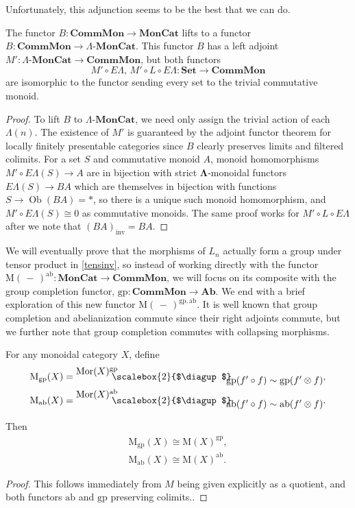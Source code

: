 \documentclass{amsbook} %
\newcommand{\mb}{\mathbf}
\newcommand{\Set}{\mb{Set}}
\newcommand{\ML}{\mathbf{\Lambda}}
\newcommand{\bigquotient}[2]{ \raisebox{0.75\height}{$#1$} \mkern-12mu\scalebox{2}{$\diagup$}\mkern-10mu \raisebox{-0.5\height}{$#2$} }
\newcommand{\EL}{E\Lambda}
\newcommand{\ob}{\operatorname{Ob}}
\newcommand{\lmc}{\Lambda\mbox{-}\mb{MonCat}}
\newcommand{\sets}{\Set}
\newcommand{\cmon}{\ensuremath{\mb{CommMon}}}
\newcommand{\moncat}{\ensuremath{\mb{MonCat}}}
\newcommand{\ab}{\mathrm{ab}}
\newcommand{\gp}{\mathrm{gp}}
\numberwithin{section}{chapter}
\begin{document}
Unfortunately, this adjunction seems to be the best that we can do. 
\begin{prop}
The functor $B \colon \cmon \rightarrow \moncat$ lifts to a functor $B \colon \cmon \rightarrow \lmc$. This functor $B$ has a left adjoint $M' \colon \lmc \rightarrow \cmon$, but both functors
  \[
    M' \circ \EL, \, M' \circ L \circ \EL \colon \sets \rightarrow \cmon
  \]
are isomorphic to the functor sending every set to the trivial commutative monoid.
\end{prop}
\begin{proof}
To lift $B$ to $\lmc$, we need only assign the trivial action of each $\Lambda(n)$. The existence of $M'$ is guaranteed by the adjoint functor theorem for locally finitely presentable categories since $B$ clearly preserves limits and filtered colimits.  For a set $S$ and commutative monoid $A$, monoid homomorphisms $M' \circ \EL(S) \rightarrow A$ are in bijection with strict $\ML$-monoidal functors $\EL(S) \rightarrow BA$ which are themselves in bijection with functions $S \rightarrow \ob(BA) = *$, so there is a unique such monoid homomorphism, and $M' \circ \EL(S) \cong 0$ as commutative monoids. The same proof works for $M' \circ L \circ \EL$ after we note that $(BA)_{\mathrm{inv}} = BA$.
\end{proof}





 We will eventually prove that the morphisms of $L_n$ actually form a group under tensor product in \cref{tensinv}, so instead of working directly with the functor $\mathrm{M}(\, - \,)^{\ab} \colon  \moncat \rightarrow \cmon$, we will focus on its composite with the group completion functor, $\gp \colon \cmon \rightarrow \mb{Ab}$. We end with a brief exploration of this new functor $\mathrm{M}(\, - \,)^{\gp,\ab}$.  
It is well known that group completion and abelianization commute since their right adjoints commute, but we further note that group completion commutes with collapsing morphisms.


\begin{lem}\label{Morder} For any monoidal category $X$, define
  \begin{align*}
  		\mathrm{M}_{\gp}(X) &= \bigquotient{\mathrm{Mor}(X)^{\gp}}{\gp(f' \circ f) \sim \gp(f' \otimes f)},\\
  		\mathrm{M}_{\ab}(X) &= \bigquotient{\mathrm{Mor}(X)^{\ab}}{\ab(f' \circ f) \sim \ab(f' \otimes f)}.
  \end{align*}

Then
  \begin{align*}
    \mathrm{M}_{\gp}(X) \cong \mathrm{M}(X)^{\gp},\\
    \mathrm{M}_{\ab}(X) \cong \mathrm{M}(X)^{\ab}.
  \end{align*}
\end{lem}
\begin{proof}
This follows immediately from $M$ being given explicitly as a quotient, and both functors $\ab$ and $\gp$ preserving colimits..
\end{proof}
\end{document}
